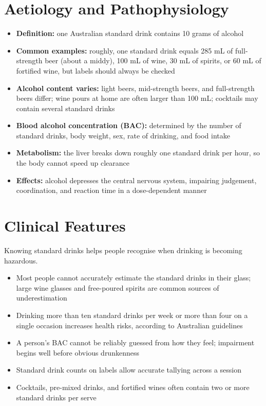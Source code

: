 \section*{Aetiology and Pathophysiology}
\begin{itemize}
    \item \textbf{Definition:} one Australian standard drink contains 10 grams of alcohol
    \item \textbf{Common examples:} roughly, one standard drink equals 285 mL of full-strength beer (about a middy), 100 mL of wine, 30 mL of spirits, or 60 mL of fortified wine, but labels should always be checked
    \item \textbf{Alcohol content varies:} light beers, mid-strength beers, and full-strength beers differ; wine pours at home are often larger than 100 mL; cocktails may contain several standard drinks
    \item \textbf{Blood alcohol concentration (BAC):} determined by the number of standard drinks, body weight, sex, rate of drinking, and food intake
    \item \textbf{Metabolism:} the liver breaks down roughly one standard drink per hour, so the body cannot speed up clearance
    \item \textbf{Effects:} alcohol depresses the central nervous system, impairing judgement, coordination, and reaction time in a dose-dependent manner
\end{itemize}

\section*{Clinical Features}
Knowing standard drinks helps people recognise when drinking is becoming hazardous.
\begin{itemize}
    \item Most people cannot accurately estimate the standard drinks in their glass; large wine glasses and free-poured spirits are common sources of underestimation
    \item Drinking more than ten standard drinks per week or more than four on a single occasion increases health risks, according to Australian guidelines
    \item A person's BAC cannot be reliably guessed from how they feel; impairment begins well before obvious drunkenness
    \item Standard drink counts on labels allow accurate tallying across a session
    \item Cocktails, pre-mixed drinks, and fortified wines often contain two or more standard drinks per serve
\end{itemize}

